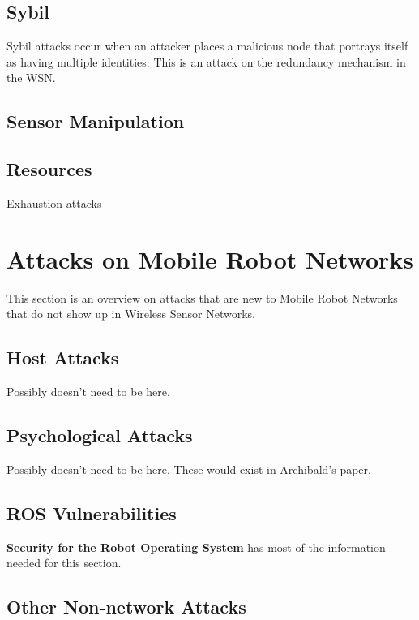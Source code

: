 \subsection{Sybil}
Sybil attacks occur when an attacker places a malicious node that portrays itself as having multiple identities. This is an attack on the redundancy mechanism in the WSN. 
\subsection{Sensor Manipulation}

\subsection{Resources}
Exhaustion attacks
\section{Attacks on Mobile Robot Networks}
This section is an overview on attacks that are new to Mobile Robot Networks that do not show up in Wireless Sensor Networks. 
\subsection{Host Attacks}
Possibly doesn't need to be here. 
\subsection{Psychological Attacks}
Possibly doesn't need to be here. These would exist in Archibald's paper. 
\subsection{ROS Vulnerabilities}
\textbf{Security for the Robot Operating System} has most of the information needed for this section.
\subsection{Other Non-network Attacks}







